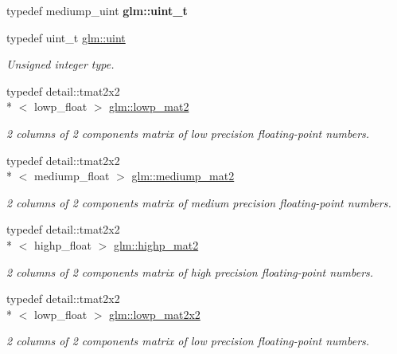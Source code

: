 \begin{DoxyCompactItemize}
\item 
\hypertarget{group__core__precision_ga5f2ae871c284c9d39ae8fdbb1305b566}{typedef mediump\-\_\-uint {\bfseries glm\-::uint\-\_\-t}}\label{group__core__precision_ga5f2ae871c284c9d39ae8fdbb1305b566}

\item 
typedef uint\-\_\-t \hyperlink{group__core__precision_ga483f6011e60602f0b73bfd0acad0f04c}{glm\-::uint}
\begin{DoxyCompactList}\small\item\em Unsigned integer type. \end{DoxyCompactList}\item 
typedef detail\-::tmat2x2\\*
$<$ lowp\-\_\-float $>$ \hyperlink{group__core__precision_ga403348153f5cd7bd52598be409afdf47}{glm\-::lowp\-\_\-mat2}
\begin{DoxyCompactList}\small\item\em 2 columns of 2 components matrix of low precision floating-\/point numbers. \end{DoxyCompactList}\item 
typedef detail\-::tmat2x2\\*
$<$ mediump\-\_\-float $>$ \hyperlink{group__core__precision_gae67a4f24fb96b68e0f0346ef4212db61}{glm\-::mediump\-\_\-mat2}
\begin{DoxyCompactList}\small\item\em 2 columns of 2 components matrix of medium precision floating-\/point numbers. \end{DoxyCompactList}\item 
typedef detail\-::tmat2x2\\*
$<$ highp\-\_\-float $>$ \hyperlink{group__core__precision_ga6652bb577f74f322220305a985a8c200}{glm\-::highp\-\_\-mat2}
\begin{DoxyCompactList}\small\item\em 2 columns of 2 components matrix of high precision floating-\/point numbers. \end{DoxyCompactList}\item 
typedef detail\-::tmat2x2\\*
$<$ lowp\-\_\-float $>$ \hyperlink{group__core__precision_gae3f6c672d0fa47ece879f2b1cda7f22b}{glm\-::lowp\-\_\-mat2x2}
\begin{DoxyCompactList}\small\item\em 2 columns of 2 components matrix of low precision floating-\/point numbers. \end{DoxyCompactList}\item 

\end{DoxyCompactItemize}
